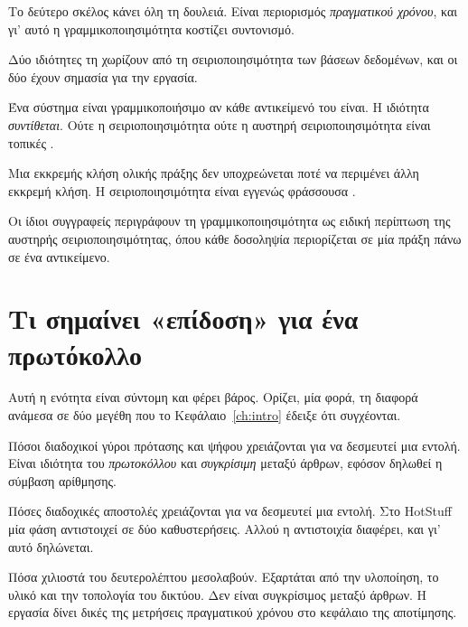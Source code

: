 Το δεύτερο σκέλος κάνει όλη τη δουλειά. Είναι περιορισμός
\emph{πραγματικού χρόνου}, και γι' αυτό η γραμμικοποιησιμότητα κοστίζει
συντονισμό.

Δύο ιδιότητες τη χωρίζουν από τη σειριοποιησιμότητα των βάσεων
δεδομένων, και οι δύο έχουν σημασία για την εργασία.

\begin{description}[leftmargin=2.2em,style=nextline,font=\normalfont\bfseries]
  \item[Τοπικότητα (\en{locality}).] Ένα σύστημα είναι γραμμικοποιήσιμο
  αν κάθε αντικείμενό του είναι. Η ιδιότητα \emph{συντίθεται}. Ούτε η
  σειριοποιησιμότητα ούτε η αυστηρή σειριοποιησιμότητα είναι τοπικές
  \cite{herlihy1990linearizability}.
  \item[Μη φραγή (\en{nonblocking}).] Μια εκκρεμής κλήση ολικής πράξης
  δεν υποχρεώνεται ποτέ να περιμένει άλλη εκκρεμή κλήση. Η
  σειριοποιησιμότητα είναι εγγενώς φράσσουσα
  \cite{herlihy1990linearizability}.
\end{description}

Οι ίδιοι συγγραφείς περιγράφουν τη γραμμικοποιησιμότητα ως ειδική
περίπτωση της αυστηρής σειριοποιησιμότητας, όπου κάθε δοσοληψία
περιορίζεται σε μία πράξη πάνω σε ένα αντικείμενο.

\section{Τι σημαίνει «επίδοση» για ένα πρωτόκολλο}
\label{sec:performance}

Αυτή η ενότητα είναι σύντομη και φέρει βάρος. Ορίζει, μία φορά, τη
διαφορά ανάμεσα σε δύο μεγέθη που το Κεφάλαιο~\ref{ch:intro} έδειξε ότι
συγχέονται.

\begin{description}[leftmargin=2.2em,style=nextline,font=\normalfont\bfseries]
  \item[Φάσεις.] Πόσοι διαδοχικοί γύροι πρότασης και ψήφου χρειάζονται
  για να δεσμευτεί μια εντολή. Είναι ιδιότητα του \emph{πρωτοκόλλου} και
  \emph{συγκρίσιμη} μεταξύ άρθρων, εφόσον δηλωθεί η σύμβαση αρίθμησης.
  \item[Καθυστερήσεις μηνυμάτων.] Πόσες διαδοχικές αποστολές
  χρειάζονται για να δεσμευτεί μια εντολή. Στο HotStuff μία φάση
  αντιστοιχεί σε δύο καθυστερήσεις. Αλλού η αντιστοιχία διαφέρει, και
  γι' αυτό δηλώνεται.
  \item[Πραγματικός χρόνος.] Πόσα χιλιοστά του δευτερολέπτου
  μεσολαβούν. Εξαρτάται από την υλοποίηση, το υλικό και την τοπολογία
  του δικτύου. Δεν είναι συγκρίσιμος μεταξύ άρθρων. Η εργασία δίνει
  δικές της μετρήσεις πραγματικού χρόνου στο κεφάλαιο της αποτίμησης.
\end{description}


